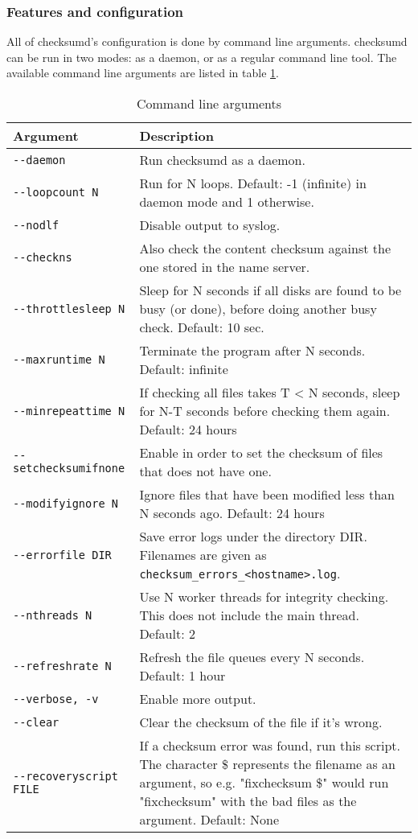 \subsubsection{Features and configuration}
All of checksumd's configuration is done by command line arguments. checksumd can be run in two modes: as a daemon, or as a regular command line tool. The available command line arguments are listed in table \ref{tab:cmdlineargs}.

\begin{table}[ht]
\begin{tabular}{lp{10cm}}
\hline
{\bf Argument}              & {\bf Description}\\
\hline
{\tt -{}-daemon}              & Run checksumd as a daemon.\\
{\tt -{}-loopcount N}         & Run for N loops. Default: -1 (infinite) in daemon mode and 1 otherwise.\\
{\tt -{}-nodlf}               & Disable output to syslog.\\
{\tt -{}-checkns}             & Also check the content checksum against the one stored in the name server.\\
{\tt -{}-throttlesleep N}     & Sleep for N seconds if all disks are found to be busy (or done), before doing another busy check. Default: 10 sec.\\
{\tt -{}-maxruntime N}        & Terminate the program after N seconds. Default: infinite\\
{\tt -{}-minrepeattime N}     & If checking all files takes T < N seconds, sleep for N-T seconds before checking them again. Default: 24 hours\\
{\tt -{}-setchecksumifnone}   & Enable in order to set the checksum of files that does not have one.\\
{\tt -{}-modifyignore N}      & Ignore files that have been modified less than N seconds ago. Default: 24 hours\\
{\tt -{}-errorfile DIR}       & Save error logs under the directory DIR. Filenames are given as {\tt checksum\_errors\_<hostname>.log}.\\
{\tt -{}-nthreads N}          & Use N worker threads for integrity checking. This does not include the main thread. Default: 2\\
{\tt -{}-refreshrate N}       & Refresh the file queues every N seconds. Default: 1 hour\\
{\tt -{}-verbose, -v}         & Enable more output.\\
{\tt -{}-clear}               & Clear the checksum of the file if it's wrong.\\
{\tt -{}-recoveryscript FILE} & If a checksum error was found, run this script. The character \$ represents the filename as an argument, so e.g. "fixchecksum \$" would run "fixchecksum" with the bad files as the argument. Default: None\\
\hline
\end{tabular}
\caption{Command line arguments}
\label{tab:cmdlineargs}
\end{table}

